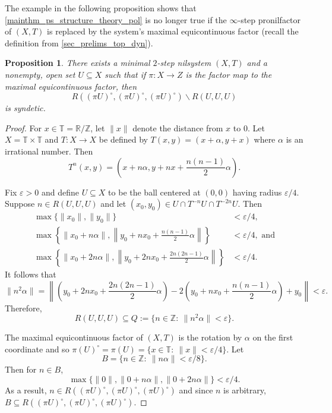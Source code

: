 \documentclass{article}
\theoremstyle{plain}
\newtheorem{proposition}[Theorem]{Proposition}
\theoremstyle{claim}
\theoremstyle{definition}
\theoremstyle{plain}
\theoremstyle{plain}
\newcommand{\Z}{\mathbb{Z}}
\newcommand{\R}{\mathbb{R}}
\newcommand{\T}{\mathbb{T}}
\renewcommand{\epsilon}{\varepsilon}
\renewcommand{\setminus}{\backslash}
\newcommand{\1}{\boldsymbol{1}}
\begin{document}
The example in the following proposition shows that \cref{mainthm_ps_structure_theory_pol} is no longer true if the $\infty$-step pronilfactor of $(X,T)$ is replaced by the system's maximal equicontinuous factor (recall the definition from \cref{sec_prelims_top_dyn}).

\begin{proposition}
\label{prop_max_equicont_factor_does_not_suffice}
There exists a minimal $2$-step nilsystem $(X, T)$ and a nonempty, open set $U \subseteq X$ such that if $\pi: X \to Z$ is the factor map to the maximal equicontinuous factor, then
\[
    R((\pi U)^\circ, (\pi U)^\circ, (\pi U)^\circ) \setminus R(U, U, U)
\]
is syndetic.
\end{proposition}
\begin{proof}
For $x \in \T = \R/\Z$, let $\lVert x \rVert$ denote the distance from $x$ to $0$.
Let $X = \T \times \T$ and $T: X \to X$ be defined by $T(x, y) = (x + \alpha, y + x)$ where $\alpha$ is an irrational number. Then
\[
    T^n(x, y) = \left(x + n \alpha, y + n x + \frac{n(n-1)}{2} \alpha\right).
\]


Fix $\epsilon > 0$ and define $U \subseteq X$ to be the ball centered at $(0, 0)$ having radius $\epsilon/4$. 
Suppose $n \in R(U, U, U)$ and let $(x_0, y_0) \in U \cap T^{-n} U \cap T^{-2n} U$. Then
\begin{align*}
        \max\{\lVert x_0 \rVert, \lVert y_0 \rVert\} &< \epsilon/4, \\
    \max\left\{\lVert x_0 + n \alpha \rVert, \left\lVert y_0 + n x_0 + \frac{n(n-1)}{2} \alpha \right\rVert\right\} &< \epsilon/4, \text{ and} \\
    \max\left\{\lVert x_0 + 2n \alpha \rVert,
    \left\lVert y_0 + 2n x_0 + \frac{2n(2n-1)}{2} \alpha \right\rVert\right\} &< \epsilon/4.
\end{align*}
It follows that
\[
    \lVert n^2 \alpha \rVert = \left\lVert \left(y_0 + 2n x_0 + \frac{2n(2n-1)}{2} \alpha\right) - 2\left(y_0 + n x_0 + \frac{n(n-1)}{2} \alpha\right) + y_0\right\rVert < \epsilon.
\]
Therefore,
\[
    R(U, U, U) \subseteq Q := \{n \in \Z: \ \lVert n^2 \alpha \rVert < \epsilon\}.
\]


The maximal equicontinuous factor of $(X, T)$ is the rotation by $\alpha$ on the first coordinate and so $\pi(U)^\circ = \pi(U)= \{x \in \T: \ \lVert x \rVert < \epsilon/4\}$. Let 
\[
    B = \{n \in \Z: \ \lVert n \alpha \rVert < \epsilon /8\}.
\]
Then for $n \in B$,
\[
    \max\{\lVert 0 \rVert, \lVert 0 + n \alpha \rVert, \lVert 0 + 2 n \alpha \rVert\} < \epsilon/4.
\]
As a result, $n \in R((\pi U)^\circ, (\pi U)^\circ, (\pi U)^\circ)$ and since $n$ is arbitrary, $B \subseteq R((\pi U)^\circ, (\pi U)^\circ, (\pi U)^\circ)$.


\end{proof}
\end{document}
